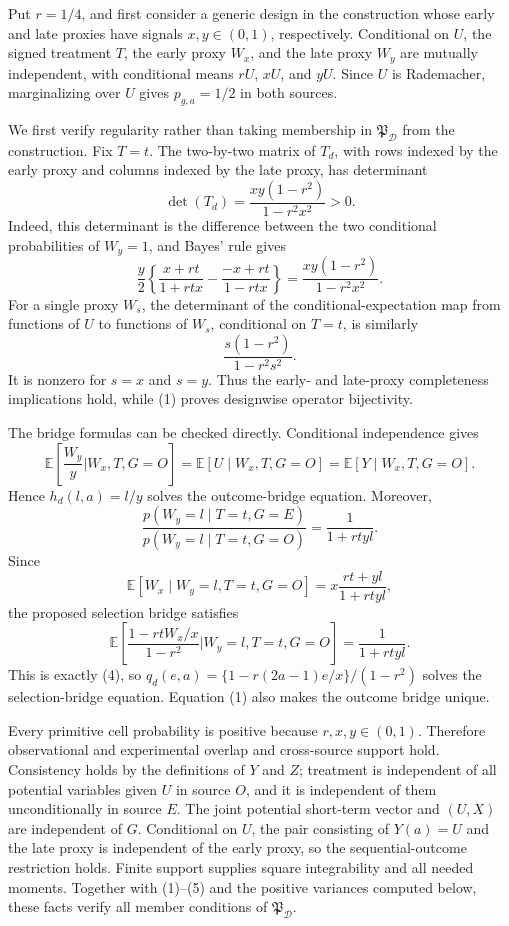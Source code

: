 Put \(r=1/4\), and first consider a generic design in the construction whose early and late proxies have signals \(x,y\in(0,1)\), respectively. Conditional on \(U\), the signed treatment \(T\), the early proxy \(W_x\), and the late proxy \(W_y\) are mutually independent, with conditional means \(rU\), \(xU\), and \(yU\). Since \(U\) is Rademacher, marginalizing over \(U\) gives \(p_{g,a}=1/2\) in both sources.

We first verify regularity rather than taking membership in \(\mathfrak P_{\mathcal D}\) from the construction. Fix \(T=t\). The two-by-two matrix of \(T_d\), with rows indexed by the early proxy and columns indexed by the late proxy, has determinant
\[
 \det(T_d)=\frac{xy(1-r^2)}{1-r^2x^2}>0. \tag{1}
\]
Indeed, this determinant is the difference between the two conditional probabilities of \(W_y=1\), and Bayes' rule gives
\[
 \frac y2\left\{
 \frac{x+rt}{1+rtx}-\frac{-x+rt}{1-rtx}
 \right\}
 =\frac{xy(1-r^2)}{1-r^2x^2}.
\]
For a single proxy \(W_s\), the determinant of the conditional-expectation map from functions of \(U\) to functions of \(W_s\), conditional on \(T=t\), is similarly
\[
 \frac{s(1-r^2)}{1-r^2s^2}. \tag{2}
\]
It is nonzero for \(s=x\) and \(s=y\). Thus the early- and late-proxy completeness implications hold, while (1) proves designwise operator bijectivity.

The bridge formulas can be checked directly. Conditional independence gives
\[
 \mathbb E\!\left[\frac{W_y}{y}\mathrel{\big|}W_x,T,G=O\right]
 =\mathbb E[U\mid W_x,T,G=O]
 =\mathbb E[Y\mid W_x,T,G=O]. \tag{3}
\]
Hence \(h_d(l,a)=l/y\) solves the outcome-bridge equation. Moreover,
\[
 \frac{p(W_y=l\mid T=t,G=E)}{p(W_y=l\mid T=t,G=O)}
 =\frac1{1+rtyl}. \tag{4}
\]
Since
\[
 \mathbb E[W_x\mid W_y=l,T=t,G=O]
 =x\frac{rt+yl}{1+rtyl},
\]
the proposed selection bridge satisfies
\[
 \mathbb E\!\left[
 \frac{1-rtW_x/x}{1-r^2}\mathrel{\big|}W_y=l,T=t,G=O
 \right]
 =\frac1{1+rtyl}. \tag{5}
\]
This is exactly (4), so \(q_d(e,a)=\{1-r(2a-1)e/x\}/(1-r^2)\) solves the selection-bridge equation. Equation (1) also makes the outcome bridge unique.

Every primitive cell probability is positive because \(r,x,y\in(0,1)\). Therefore observational and experimental overlap and cross-source support hold. Consistency holds by the definitions of \(Y\) and \(Z\); treatment is independent of all potential variables given \(U\) in source \(O\), and it is independent of them unconditionally in source \(E\). The joint potential short-term vector and \((U,X)\) are independent of \(G\). Conditional on \(U\), the pair consisting of \(Y(a)=U\) and the late proxy is independent of the early proxy, so the sequential-outcome restriction holds. Finite support supplies square integrability and all needed moments. Together with (1)--(5) and the positive variances computed below, these facts verify all member conditions of \(\mathfrak P_{\mathcal D}\).

